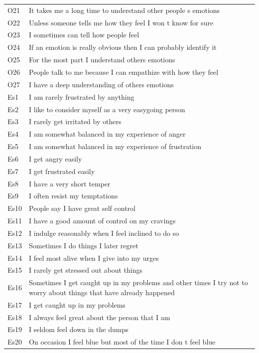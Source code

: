 \documentclass[man]{apa6}
\begin{document}
\begin{longtable}{ll}
\addlinespace
O21 & It takes me a long time to understand other people s emotions\\
O22 & Unless someone tells me how they feel I won t know for sure\\
O23 & I sometimes can tell how people feel\\
O24 & If an emotion is really obvious then I can probably identify it\\
O25 & For the most part I understand others  emotions\\
\addlinespace
O26 & People talk to me  because I can empathize with how they feel\\
O27 & I have a deep understanding of others  emotions\\
Es1 & I am rarely frustrated by anything\\
Es2 & I like to consider myself as a very easygoing person\\
Es3 & I rarely get irritated by others\\
\addlinespace
Es4 & I am somewhat balanced in my experience of anger\\
Es5 & I am somewhat balanced in my experience of frustration\\
Es6 & I get angry easily\\
Es7 & I get frustrated easily\\
Es8 & I have a very short temper\\
\addlinespace
Es9 & I often resist my temptations\\
Es10 & People say I have great  self control\\
Es11 & I have a good amount of control on my cravings\\
Es12 & I indulge reasonably when I feel inclined to do so\\
Es13 & Sometimes I do things I later regret\\
\addlinespace
Es14 & I feel most alive when I give into my urges\\
Es15 & I rarely get stressed out about things\\
Es16 & Sometimes I get caught up in my problems  and other times I try not to worry about things that have already happened\\
Es17 & I get caught up in my problems\\
Es18 & I always feel great about the person that I am\\
\addlinespace
Es19 & I seldom feel down in the dumps\\
Es20 & On occasion  I feel blue  but most of the time I don t feel blue\\

\end{longtable}
\end{document}
